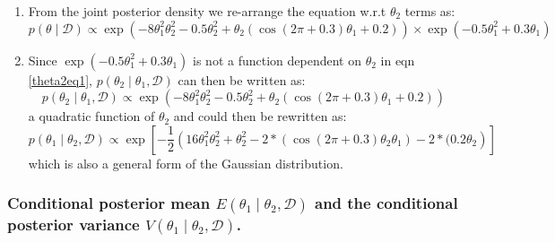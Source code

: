 \documentclass[12pt]{article}
\begin{document}
\begin{enumerate}
    \item From the joint posterior density we re-arrange the equation w.r.t $\theta_2$ terms as:
\begin{equation}\label{theta2eq1}
p(\theta \mid \mathcal{D}) \propto \exp \left( -8\theta_1^2\theta_2^2 - 0.5\theta_2^2 + \theta_2(\cos(2\pi + 0.3)\theta_1 + 0.2) \right) \times \exp \left( -0.5\theta_1^2 + 0.3\theta_1 \right) 
\end{equation} 
\item Since  $\exp  \left( -0.5\theta_1^2 + 0.3\theta_1 \right)$  is not a function dependent on $\theta_2$ in eqn  \ref{theta2eq1}, $p(\theta_2 \mid \theta_1 ,\mathcal{D}) $ can then be written as:
 \begin{equation}\label{theta2eq2}
p(\theta_2 \mid \theta_1 ,\mathcal{D}) \propto \exp \left( -8\theta_1^2\theta_2^2 - 0.5\theta_2^2 + \theta_2(\cos(2\pi + 0.3)\theta_1 + 0.2) \right)
\end{equation} 
a quadratic function of $\theta_2$ and could then be rewritten as:
 \begin{equation}\label{theta2eq3}
p(\theta_1 \mid \theta_2 ,\mathcal{D}) \propto \exp\left[- \frac{1}{2}\left( 16\theta_1^2\theta_2^2 + \theta_2^2 - 2*(\cos(2\pi + 0.3)\theta_2 \theta_1) - 2*(0.2\theta_2 \right)\right]
\end{equation} which is also a general form of the Gaussian distribution.
   
\end{enumerate}
\subsubsection{Conditional posterior mean \(E(\theta_1 \mid \theta_2, \mathcal{D})\) and the conditional posterior variance \(V(\theta_1 \mid \theta_2, \mathcal{D})\).}
\end{document}
